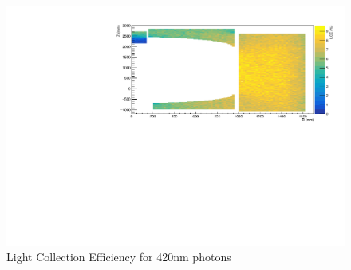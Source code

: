 \begin{figure}[!htbp]%
\centering
\includegraphics[width=\textwidth]{Data/GdLS_Physics/Light_Collection/od_tanks_lce.pdf}
\caption{Light Collection Efficiency for 420nm photons}
\label{fig:od_lce}
\end{figure}